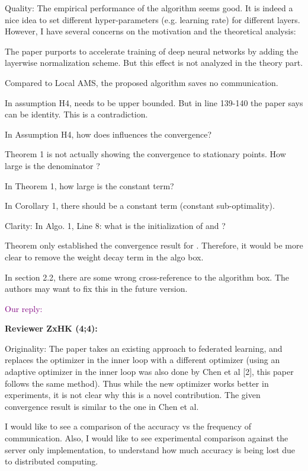\documentclass{article}
\begin{document}
Quality:
The empirical performance of the algorithm seems good. It is indeed a nice idea to set different hyper-parameters (e.g. learning rate) for different layers. However, I have several concerns on the motivation and the theoretical analysis:

The paper purports to accelerate training of deep neural networks by adding the layerwise normalization scheme. But this effect is not analyzed in the theory part.

Compared to Local AMS, the proposed algorithm saves no communication.

In assumption H4,  needs to be upper bounded. But in line 139-140 the paper says  can be identity. This is a contradiction.

In Assumption H4, how does 
 influences the convergence?

Theorem 1 is not actually showing the convergence to stationary points. How large is the denominator 
?

In Theorem 1, how large is the constant term?

In Corollary 1, there should be a constant term (constant sub-optimality).

Clarity:
In Algo. 1, Line 8: what is the initialization of  and ?

Theorem only established the convergence result for . Therefore, it would be more clear to remove the weight decay term in the algo box.

In section 2.2, there are some wrong cross-reference to the algorithm box. The authors may want to fix this in the future version.

\textcolor{purple}{Our reply:}



\textbf{Reviewer ZxHK (4;4):}

Originality: The paper takes an existing approach to federated learning, and replaces the optimizer in the inner loop with a different optimizer (using an adaptive optimizer in the inner loop was also done by Chen et al [2], this paper follows the same method). Thus while the new optimizer works better in experiments, it is not clear why this is a novel contribution. The given convergence result is similar to the one in Chen et al.

I would like to see a comparison of the accuracy vs the frequency of communication. Also, I would like to see experimental comparison against the server only implementation, to understand how much accuracy is being lost due to distributed computing.
\end{document}
